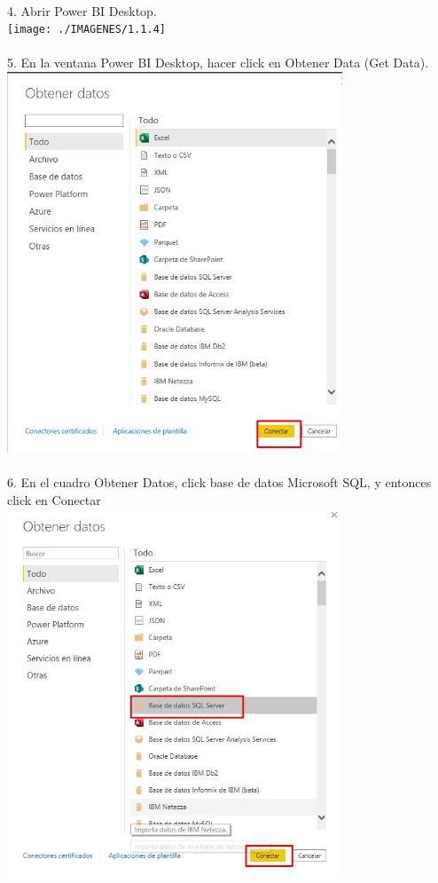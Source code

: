 \documentclass[preprint,12pt]{elsarticle}
\begin{document}
\begin{itemize}
		 		\\ 4. Abrir Power BI Desktop.
		 	\\ \texttt{[image: ./IMAGENES/1.1.4]} \\
		 		\\ 5. En la ventana Power BI Desktop, hacer click en Obtener Data (Get Data).
		 	\\ \includegraphics[width=10cm]{./IMAGENES/1.1.5} \\
		 		\\ 6. En el cuadro Obtener Datos, click base de datos Microsoft SQL, y entonces click en Conectar
		 		\\ \includegraphics[width=10cm]{./IMAGENES/1.1.6} \\

\end{itemize}
\end{document}
